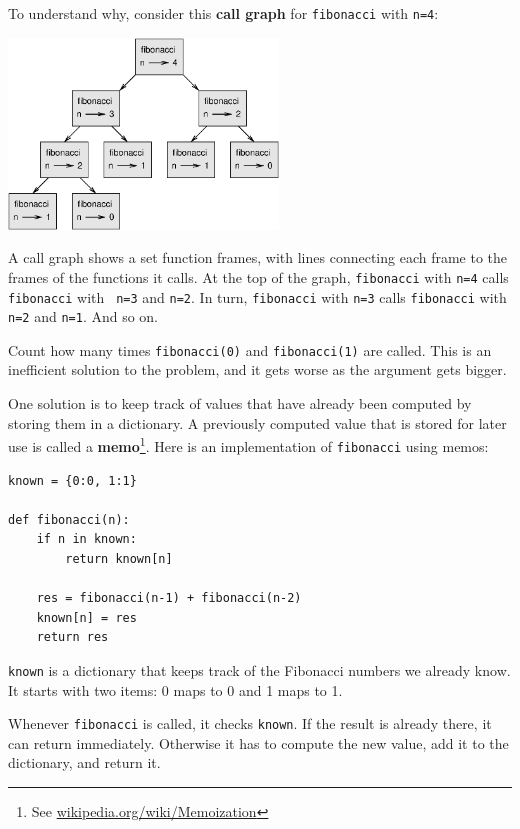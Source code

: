 \documentclass[10pt]{book}
\begin{document}

To understand why, consider this {\bf call graph} for
{\tt fibonacci} with {\tt n=4}:

\beforefig
\centerline{\includegraphics[height=2in]{figs/fibonacci.eps}}
\afterfig

A call graph shows a set function frames, with lines connecting each
frame to the frames of the functions it calls.  At the top of the
graph, {\tt fibonacci} with {\tt n=4} calls {\tt fibonacci} with {\tt
n=3} and {\tt n=2}.  In turn, {\tt fibonacci} with {\tt n=3} calls
{\tt fibonacci} with {\tt n=2} and {\tt n=1}.  And so on.


Count how many times {\tt fibonacci(0)} and {\tt fibonacci(1)} are
called.  This is an inefficient solution to the problem, and it gets
worse as the argument gets bigger.


One solution is to keep track of values that have already been
computed by storing them in a dictionary.  A previously computed value
that is stored for later use is called a {\bf memo}\footnote{See
  \url{wikipedia.org/wiki/Memoization}}.  Here is an
implementation of {\tt fibonacci} using memos:

\beforeverb
\begin{verbatim}
known = {0:0, 1:1}

def fibonacci(n):
    if n in known:
        return known[n]

    res = fibonacci(n-1) + fibonacci(n-2)
    known[n] = res
    return res
\end{verbatim}
\afterverb
%
{\tt known} is a dictionary that keeps track of the Fibonacci
numbers we already know.  It starts with
two items: 0 maps to 0 and 1 maps to 1.

Whenever {\tt fibonacci} is called, it checks {\tt known}.
If the result is already there, it can return
immediately.  Otherwise it has to 
compute the new value, add it to the dictionary, and return it.
\end{document}

